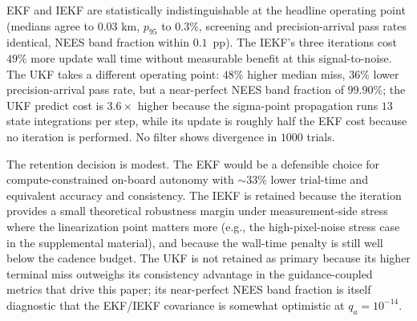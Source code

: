 \documentclass[10pt,twocolumn]{article}
\newcommand{\chisq}{\chi^2}
\begin{document}
\begin{table}[t]
\centering
\caption{Estimator ablation, $n=1000$ matched seeds.  ``NEES band'' is the empirical fraction of trial-mean NEES values inside the $\chisq(6)$ 95\% band.  Predict/update times are medians of the per-trial mean wall time.}
\label{tab:estimator-ablation}
\scriptsize
{}
\end{table}

EKF and IEKF are statistically indistinguishable at the headline operating point (medians agree to $0.03$ km, $p_{95}$ to $0.3\%$, screening and precision-arrival pass rates identical, NEES band fraction within $0.1$~pp).  The IEKF's three iterations cost $49\%$ more update wall time without measurable benefit at this signal-to-noise.  The UKF takes a different operating point: $48\%$ higher median miss, $36\%$ lower precision-arrival pass rate, but a near-perfect NEES band fraction of $99.90\%$; the UKF predict cost is $3.6\times$ higher because the sigma-point propagation runs $13$ state integrations per step, while its update is roughly half the EKF cost because no iteration is performed.  No filter shows divergence in $1000$ trials.

The retention decision is modest.  The EKF would be a defensible choice for compute-constrained on-board autonomy with $\sim 33\%$ lower trial-time and equivalent accuracy and consistency.  The IEKF is retained because the iteration provides a small theoretical robustness margin under measurement-side stress where the linearization point matters more (e.g., the high-pixel-noise stress case in the supplemental material), and because the wall-time penalty is still well below the cadence budget.  The UKF is not retained as primary because its higher terminal miss outweighs its consistency advantage in the guidance-coupled metrics that drive this paper; its near-perfect NEES band fraction is itself diagnostic that the EKF/IEKF covariance is somewhat optimistic at $q_a=10^{-14}$.
\end{document}
